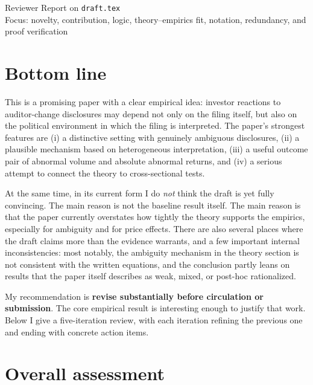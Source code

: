 \documentclass[11pt]{article}
\begin{document}
\begin{center}
{\LARGE Reviewer Report on \texttt{draft.tex}}\\[0.5em]
{\large Focus: novelty, contribution, logic, theory--empirics fit, notation, redundancy, and proof verification}\\[0.5em]
\end{center}

\section*{Bottom line}
This is a promising paper with a clear empirical idea: investor reactions to auditor-change disclosures may depend not only on the filing itself, but also on the political environment in which the filing is interpreted. The paper's strongest features are (i) a distinctive setting with genuinely ambiguous disclosures, (ii) a plausible mechanism based on heterogeneous interpretation, (iii) a useful outcome pair of abnormal volume and absolute abnormal returns, and (iv) a serious attempt to connect the theory to cross-sectional tests.

At the same time, in its current form I do \emph{not} think the draft is yet fully convincing. The main reason is not the baseline result itself. The main reason is that the paper currently overstates how tightly the theory supports the empirics, especially for ambiguity and for price effects. There are also several places where the draft claims more than the evidence warrants, and a few important internal inconsistencies: most notably, the ambiguity mechanism in the theory section is not consistent with the written equations, and the conclusion partly leans on results that the paper itself describes as weak, mixed, or post-hoc rationalized.

My recommendation is \textbf{revise substantially before circulation or submission}. The core empirical result is interesting enough to justify that work. Below I give a five-iteration review, with each iteration refining the previous one and ending with concrete action items.

\section*{Overall assessment}
\end{document}
